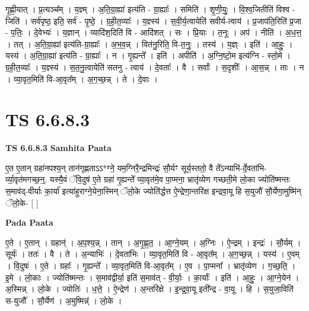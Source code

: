 \documentclass[17pt]{extarticle}
\begin{document}
गृ॒ह्णी॒यात् । प्र॒त्यञ्च᳚म् । य॒ज्ञ्म् । अ॒ति॒ग्रा॒ह्या॑ इत्य॑ति - ग्रा॒ह्याः᳚ । समिति॑ । शृ॒णी॒युः॒ । वि॒श्व॒जितीति॑ विश्व - जिति॑ । सर्व॑पृष्ठ॒ इति॒ सर्व॑ - पृ॒ष्ठे॒ । ग्र॒ही॒त॒व्याः᳚ । य॒ज्ञ्स्य॑ । स॒वी॒र्य॒त्वायेति॑ सवीर्य-त्वाय॑ । प्र॒जाप॑ति॒रिति॑ प्र॒जा - प॒तिः॒ । दे॒वेभ्यः॑ । य॒ज्ञान् । व्यादि॑श॒दिति॑ वि - आदि॑शत् । सः । प्रि॒याः । त॒नूः । अप॑ । नीति॑ । अ॒ध॒त्त॒ । तत् । अ॒ति॒ग्रा॒ह्या॑ इत्य॑ति-ग्रा॒ह्याः᳚ । अ॒भ॒व॒न्न् । वित॑नु॒रिति॒ वि-त॒नुः॒ । तस्य॑ । य॒ज्ञ्ः । इति॑ । आ॒हुः॒ । यस्य॑ । अ॒ति॒ग्रा॒ह्या॑ इत्य॑ति - ग्रा॒ह्याः᳚ । न । गृ॒ह्यन्ते᳚ । इति॑ । अपीति॑ । अ॒ग्नि॒ष्टो॒म इत्य॑ग्नि - स्तो॒मे । ग्र॒ही॒त॒व्याः᳚ । य॒ज्ञ्स्य॑ । स॒त॒नु॒त्वायेति॑ सतनु - त्वाय॑ । दे॒वताः᳚ । वै । सर्वाः᳚ । स॒दृशीः᳚ । आ॒स॒न्न् । ताः । न । व्या॒वृत॒मिति॑ वि-आ॒वृत᳚म् । अ॒ग॒च्छ॒न्न् । ते । दे॒वाः ।  \newline




\section*{ TS 6.6.8.3 }

\textbf{TS 6.6.8.3 } \newline
\textbf{Samhita Paata} \newline

ए॒त ए॒तान् ग्रहा॑नपश्य॒न् तान॑गृह्णताऽऽ*ग्ने॒ यम॒ग्निरै॒न्द्रमिन्द्रः॑ सौ॒र्यꣳ सूर्य॒स्ततो॒ वै ते᳚ऽन्याभि॑-र्दे॒वता॑भि-र्व्या॒वृत॑मगच्छ॒न्॒. यस्यै॒वं ॅवि॒दुष॑ ए॒ते ग्रहा॑ गृ॒ह्यन्ते᳚ व्या॒वृत॑मे॒व पा॒प्मना॒ भ्रातृ॑व्येण गच्छती॒मे लो॒का ज्योति॑ष्मन्तः स॒माव॑द्-वीर्याः का॒र्या॑ इत्या॑हुराग्ने॒येना॒स्मिन् ॅलो॒के ज्योति॑र्द्धत्त ऐ॒न्द्रेणा॒न्तरि॑क्ष इन्द्रवा॒यू हि स॒युजौ॑ सौ॒र्येणा॒मुष्मि॑न् ॅलो॒के- [  ] \newline

\textbf{Pada Paata} \newline

ए॒ते । ए॒तान् । ग्रहान्॑ । अ॒प॒श्य॒न्न् । तान् । अ॒गृ॒ह्ण॒त॒ । आ॒ग्ने॒यम् । अ॒ग्निः । ऐ॒न्द्रम् । इन्द्रः॑ । सौ॒र्यम् । सूर्यः॑ । ततः॑ । वै । ते । अ॒न्याभिः॑ । दे॒वता॑भिः । व्या॒वृत॒मिति॑ वि - आ॒वृत᳚म् । अ॒ग॒च्छ॒न्न् । यस्य॑ । ए॒वम् । वि॒दुषः॑ । ए॒ते । ग्रहाः᳚ । गृ॒ह्यन्ते᳚ । व्या॒वृत॒मिति॑ वि-आ॒वृत᳚म् । ए॒व । पा॒प्मना᳚ । भ्रातृ॑व्येण । ग॒च्छ॒ति॒ । इ॒मे । लो॒काः । ज्योति॑ष्मन्तः । स॒माव॑द्वीर्या॒ इति॑ स॒माव॑त् - वी॒र्याः॒ । का॒र्याः᳚ । इति॑ । आ॒हुः॒ । आ॒ग्ने॒येन॑ । अ॒स्मिन्न् । लो॒के । ज्योतिः॑ । ध॒त्ते॒ । ऐ॒न्द्रेण॑ । अ॒न्तरि॑क्षे । इ॒न्द्र॒वा॒यू इती᳚न्द्र - वा॒यू । हि । स॒युजा॒विति॑ स-युजौ᳚ । सौ॒र्येण॑ । अ॒मुष्मिन्न्॑ । लो॒के ।  \newline
\end{document}
